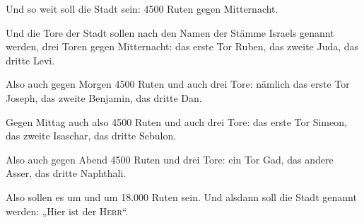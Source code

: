  Und so weit soll die Stadt sein: 4500 Ruten gegen
Mitternacht.

 Und die Tore der Stadt sollen nach den Namen der Stämme
Israels genannt werden, drei Toren gegen Mitternacht: das erste Tor
Ruben, das zweite Juda, das dritte Levi.

 Also auch gegen Morgen 4500 Ruten und auch drei Tore:
nämlich das erste Tor Joseph, das zweite Benjamin, das dritte Dan.

 Gegen Mittag auch also 4500 Ruten und auch drei Tore:
das erste Tor Simeon, das zweite Isaschar, das dritte Sebulon.

 Also auch gegen Abend 4500 Ruten und drei Tore: ein Tor
Gad, das andere Asser, das dritte Naphthali.

 Also sollen es um und um 18.000 Ruten sein. Und alsdann
soll die Stadt genannt werden: „Hier ist der \textsc{Herr}``.
